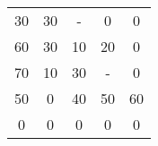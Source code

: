 \begin{tabular}{ccccc}
30     & 30     & -      & 0      & 0 \\
60     & 30     & 10     & 20     & 0 \\
70     & 10     & 30     & -      & 0 \\
50     & 0      & 40     & 50     & 60 \\
0      & 0      & 0      & 0      & 0 \bigstrut[b]\\
\hline
\hline
\end{tabular}%
